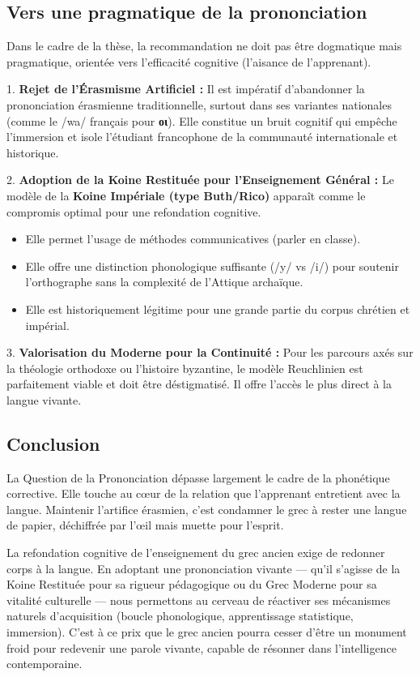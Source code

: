 \subsection{Vers une pragmatique de la prononciation}

Dans le cadre de la thèse, la recommandation ne doit pas être dogmatique mais pragmatique, orientée
vers l'efficacité cognitive (l'aisance de l'apprenant).

1. \textbf{Rejet de l'Érasmisme Artificiel :} Il est impératif d'abandonner la prononciation
érasmienne traditionnelle, surtout dans ses variantes nationales (comme le /wa/ français pour
\textbf{οι}). Elle constitue un bruit cognitif qui empêche l'immersion et isole l'étudiant
francophone de la communauté internationale et historique.\cite{ref4}

2. \textbf{Adoption de la Koine Restituée pour l'Enseignement Général :} Le modèle de la
\textbf{Koine Impériale (type Buth/Rico)} apparaît comme le compromis optimal pour une refondation
cognitive.\cite{ref28}

\begin{itemize}\item Elle permet l'usage de méthodes communicatives (parler en classe).\item Elle offre une distinction phonologique suffisante (/y/ vs /i/) pour soutenir l'orthographe sans la complexité de l'Attique archaïque.\item Elle est historiquement légitime pour une grande partie du corpus chrétien et impérial.\end{itemize}3. \textbf{Valorisation du Moderne pour la Continuité :} Pour les parcours axés sur la théologie
orthodoxe ou l'histoire byzantine, le modèle Reuchlinien est parfaitement viable et doit être
déstigmatisé. Il offre l'accès le plus direct à la langue \og vivante\fg{}.\cite{ref34}



\subsection{Conclusion}

La \og Question de la Prononciation\fg{} dépasse largement le cadre de la phonétique corrective.
Elle touche au cœur de la relation que l'apprenant entretient avec la langue. Maintenir l'artifice
érasmien, c'est condamner le grec à rester une langue de papier, déchiffrée par l'œil mais muette
pour l'esprit.

La refondation cognitive de l'enseignement du grec ancien exige de redonner corps à la langue. En
adoptant une prononciation vivante — qu'il s'agisse de la Koine Restituée pour sa rigueur
pédagogique ou du Grec Moderne pour sa vitalité culturelle — nous permettons au cerveau de réactiver
ses mécanismes naturels d'acquisition (boucle phonologique, apprentissage statistique, immersion).
C'est à ce prix que le grec ancien pourra cesser d'être un \og monument\fg{} froid pour redevenir
une parole vivante, capable de résonner dans l'intelligence contemporaine.

